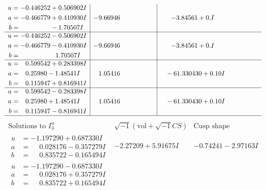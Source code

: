 \documentclass[1p]{elsarticle_modified}
\theoremstyle{definition}
\newcommand{\I}{\sqrt{-1}}
\begin{document}
$$\begin{array}{c|c|c}
\begin{aligned}
u &= -0.446252 + 0.506902 I \\
a &= -0.466779 + 0.410930 I \\
b &= \phantom{-0.000000 } -1.70507 I\end{aligned}
 & -9.66946\phantom{ +0.000000I} & -3.84561 + 0. I\phantom{ +0.000000I} \\ \hline\begin{aligned}
u &= -0.446252 - 0.506902 I \\
a &= -0.466779 - 0.410930 I \\
b &= \phantom{-0.000000 -}1.70507 I\end{aligned}
 & -9.66946\phantom{ +0.000000I} & -3.84561 + 0. I\phantom{ +0.000000I} \\ \hline\begin{aligned}
u &= \phantom{-}0.599542 + 0.283398 I \\
a &= \phantom{-}0.25980 - 1.48541 I \\
b &= \phantom{-}0.115947 + 0.816941 I\end{aligned}
 & \phantom{-}1.05416\phantom{ +0.000000I} & \phantom{-}                -6
1.330430 + 0. 10   I\phantom{ +0.000000I} \\ \hline\begin{aligned}
u &= \phantom{-}0.599542 - 0.283398 I \\
a &= \phantom{-}0.25980 + 1.48541 I \\
b &= \phantom{-}0.115947 - 0.816941 I\end{aligned}
 & \phantom{-}1.05416\phantom{ +0.000000I} & \phantom{-}                -6
1.330430 + 0. 10   I\phantom{ +0.000000I}\\
 \hline 
 \end{array}$$\newpage$$\begin{array}{c|c|c}  
\text{Solutions to }I^u_{3}& \I (\text{vol} + \sqrt{-1}CS) & \text{Cusp shape}\\
 \hline 
\begin{aligned}
u &= -1.197290 + 0.687330 I \\
a &= \phantom{-}0.028176 - 0.357279 I \\
b &= \phantom{-}0.835722 - 0.165494 I\end{aligned}
 & -2.27209 + 5.91675 I & -0.74241 - 2.97163 I \\ \hline\begin{aligned}
u &= -1.197290 - 0.687330 I \\
a &= \phantom{-}0.028176 + 0.357279 I \\
b &= \phantom{-}0.835722 + 0.165494 I\end{aligned}

\end{array}$$
\end{document}
